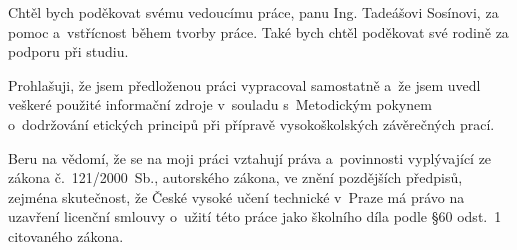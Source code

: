 \documentclass[czech,master,unicode,draft]{ctufit-thesis}
\theoremstyle{plain}
\theoremstyle{definition}
\theoremstyle{remark}
\numberwithin{theorem}{chapter}
\begin{document}
 
\frontmatter\frontmatterinit %


\thispagestyle{empty}\cleardoublepage\maketitle %

\imprintpage %

\tableofcontents %
\listoffigures %
\begingroup
\let\clearpage\relax
\listoflistings %
\endgroup

\begin{acknowledgmentpage}
	Chtěl bych poděkovat svému vedoucímu práce, panu Ing. Tadeášovi Sosínovi, za pomoc a~vstřícnost během tvorby práce. Také bych chtěl poděkovat své rodině za podporu při studiu.
\end{acknowledgmentpage} 


\begin{declarationpage}
Prohlašuji, že jsem předloženou práci vypracoval samostatně a~že jsem uvedl veškeré použité informační zdroje v~souladu s~Metodickým pokynem o~dodržování etických principů při přípravě vysokoškolských závěrečných prací.

Beru na vědomí, že se na moji práci vztahují práva a~povinnosti vyplývající ze zákona č.~121/2000~Sb., autorského zákona, ve znění pozdějších předpisů, zejména skutečnost, že České vysoké učení technické v~Praze má právo na uzavření licenční smlouvy o~užití této práce jako školního díla podle §60 odst.~1 citovaného zákona.
\end{declarationpage}
\end{document}
